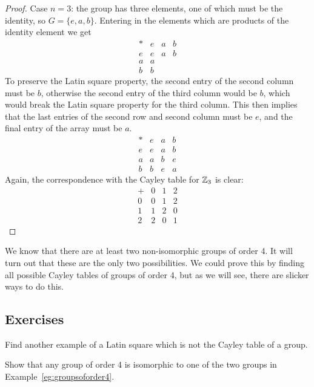\begin{proof}
  Case $n=3$: the group has three elements, one of which must be the identity,
  so $G = \{e, a, b\}$.  Entering in the elements which are products of the
  identity element we get
  \[
    \begin{array}{c|ccc}
      \ast & e & a & b \\
      \hline
      e & e & a & b \\
      a & a &  \\
      b & b &  
    \end{array}
  \]
  To preserve the Latin square property, the second entry of the second
  column must be $b$, otherwise the second entry of the third column would be
  $b$, which would break the Latin square property for the third column.
  This then implies that the last entries of the second row and second
  column must be $e$, and the final entry of the array must be $a$.
  \[
    \begin{array}{c|ccc}
      \ast & e & a & b \\
      \hline
      e & e & a & b \\
      a & a & b & e \\
      b & b & e & a
    \end{array}
  \]
  Again, the correspondence with the Cayley table for $\mathbb{Z}_{3}$ is clear:
  \[
    \begin{array}{c|ccc}
      + & 0 & 1 & 2\\
      \hline
      0 & 0 & 1 & 2\\
      1 & 1 & 2 & 0 \\
      2 & 2 & 0 & 1 
    \end{array}
  \]
\end{proof}

We know that there are at least two non-isomorphic groups of order 4.  It will
turn out that these are the only two possibilities.  We could prove this
by finding all possible Cayley tables of groups of order 4, but as we will
see, there are slicker ways to do this.

\subsection*{Exercises}

\begin{exercises}
  \item Find another example of a Latin square which is not the Cayley table
    of a group.
  
  \item Show that any group of order 4 is isomorphic to one of the two groups
    in Example~\ref{eg:groupsoforder4}.
\end{exercises}

